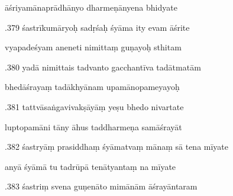 \documentclass[article,12pt,a4paper]{memoir}%
\newcounter{parCount}
\begin{document}
	  
	  \pstart \leavevmode%
	āśriyamānaprādhānyo dharmeṇānyena bhidyate 
	{}
	\pend%
      

	  
	  \pstart {}.379 śastrīkumāryoḥ sadṛśaḥ śyāma ity evam āśrite 
	{}
	\pend%
      

	  
	  \pstart \leavevmode%
	vyapadeśyam aneneti nimittaṃ guṇayoḥ sthitam 
	{}
	\pend%
      

	  
	  \pstart {}.380 yadā nimittais tadvanto gacchantīva tadātmatām 
	{}
	\pend%
      

	  
	  \pstart \leavevmode%
	bhedāśrayaṃ tadākhyānam upamānopameyayoḥ 
	{}
	\pend%
      

	  
	  \pstart {}.381 tattvāsaṅgavivakṣāyāṃ yeṣu bhedo nivartate 
	{}
	\pend%
      

	  
	  \pstart \leavevmode%
	luptopamāni tāny āhus taddharmeṇa samāśrayāt 
	{}
	\pend%
      

	  
	  \pstart {}.382 śastryāṃ prasiddhaṃ śyāmatvaṃ mānaṃ sā tena mīyate 
	{}
	\pend%
      

	  
	  \pstart \leavevmode%
	anyā śyāmā tu tadrūpā tenātyantaṃ na mīyate 
	{}
	\pend%
      

	  
	  \pstart {}.383 śastriṃ svena guṇenāto mimānām āśrayāntaram 
	{}
	\pend%
      
\end{document}
